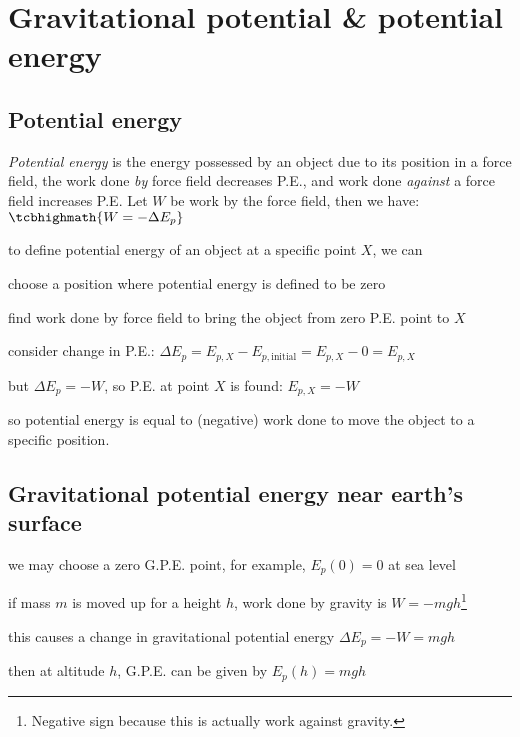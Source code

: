 \section{Gravitational potential \& potential energy}

\subsection{Potential energy}

\emph{Potential energy} is the energy possessed by an object due to its position in a force field, the work done \emph{by} force field decreases P.E., and work done \emph{against} a force field increases P.E. Let $W$ be work by the force field, then we have: $\tcbhighmath{W=-\Delta E_p}$


to define potential energy of an object at a specific point $X$, we can

\begin{compactenum}
	\item[(1)] choose a position where potential energy is defined to be zero
	
	\item[(2)] find work done by force field to bring the object from zero P.E. point to $X$
	
	\item[(3)] consider change in P.E.: $\Delta E_p = E_{p,X} - E_{p,\text{initial}} = E_{p,X} - 0 = E_{p,X}$
	
	but $\Delta E_p = -W$, so P.E. at point $X$ is found: $E_{p,X} = -W$
	
\end{compactenum}

so potential energy is equal to (negative) work done to move the object to a specific position.

\subsection*{Gravitational potential energy near earth's surface}

we may choose a zero G.P.E. point, for example, $E_p(0) = 0$ at sea level

if mass $m$ is moved up for a height $h$, work done by gravity is $W=-mgh$\footnote{Negative sign because this is actually work against gravity.}

this causes a change in gravitational potential energy $\Delta E_p=-W=mg h$

then at altitude $h$, G.P.E. can be given by $E_p(h)=mgh$

